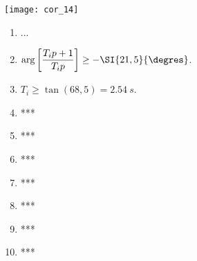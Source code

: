 \begin{multicols}{2}
\ifprof
\begin{corrige}
\begin{center}
\texttt{[image: cor\_14]}
\end{center}
\end{corrige}
\else
\fi

\footnotesize
\begin{enumerate}
\item ...
\item $\arg \left[  \dfrac{T_i p+1}{T_i p}  \right] \geq - \SI{21,5}{\degres}$.
\item $T_i \geq \tan(68,5)=\SI{2,54}{s}$.
\item ***
\item ***
\item ***
\item ***
\item ***
\item ***
\item ***
\end{enumerate}
\normalsize


\ifprof
\else
\end{multicols}
\fi

